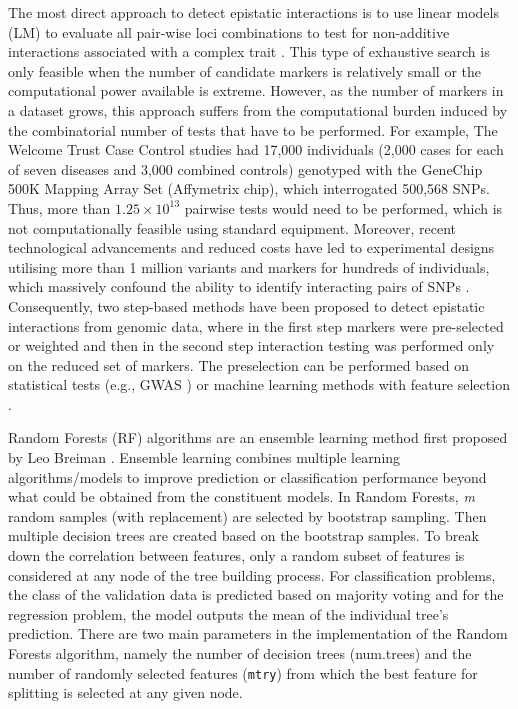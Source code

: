 \documentclass[preprint,12pt,3p]{elsarticle}
\begin{document}
The most direct approach to detect epistatic interactions is to use linear models (LM) to evaluate all pair-wise loci
combinations to test for non-additive interactions associated with a complex trait \cite[]{Zhang.et.al.2008}. This type
of exhaustive search is only feasible when the number of candidate markers is relatively small or the computational
power available is extreme. However, as the number of markers in a dataset grows, this approach suffers from the
computational burden induced by the combinatorial number of tests that have to be performed. For example, The Welcome
Trust Case Control studies \cite[]{burtonGenomewideAssociationStudy2007brief} had 17,000 individuals (2,000 cases for
each of seven diseases and 3,000 combined controls) genotyped with the GeneChip 500K Mapping Array Set (Affymetrix
chip), which interrogated 500,568 SNPs. Thus, more than $1.25\times 10^{13}$ pairwise tests would need to be performed, which is
not computationally feasible using standard equipment. Moreover, recent technological advancements and reduced costs
have led to experimental designs utilising more than 1 million variants and markers for hundreds of individuals,
which massively confound the ability to identify interacting pairs of SNPs \cite[]{Ha.et.al2014,
  Gholami.et.el2014,1000GenomeProject.2015.brief,utah.edu}. Consequently, two step-based methods have been proposed to
detect epistatic interactions from genomic data, where in the first step markers were pre-selected or weighted and then
in the second step interaction testing was performed only on the reduced set of markers. The preselection can be
performed based on statistical tests (e.g., GWAS \cite[]{Pecanka.et.al.2017}) or machine learning methods with feature
selection \cite[]{Jiang.et.al.2009, Meng.et.al.2007}.




Random Forests (RF) algorithms are an ensemble learning method first proposed by Leo Breiman \cite[]{Breiman2001}. Ensemble
learning combines multiple learning algorithms/models to improve prediction or classification performance beyond what
could be obtained from the constituent models. In Random Forests, \textit{m} random samples (with replacement) are
selected by bootstrap sampling. Then multiple decision trees are created based on the bootstrap samples. To break down
the correlation between features, only a random subset of features is considered at any node of the tree building
process. For classification problems, the class of the validation data is predicted based on majority voting and for the
regression problem, the model outputs the mean of the individual tree's prediction. There are two main parameters in the
implementation of the Random Forests algorithm, namely the number of decision trees (num.trees) and the number of
randomly selected features (\texttt{mtry}) from which the best feature for splitting is selected at any given node.
\end{document}
